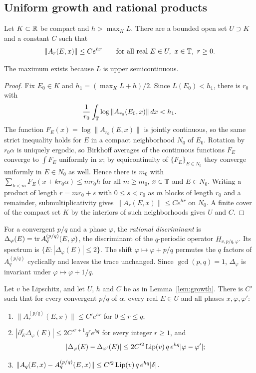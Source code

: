 \subsection{Uniform growth and rational products}

\begin{lemma}\label{lem:growth}
Let $K\subset\mathbb R$ be compact and $h>\max_KL$. There are a bounded open set $U\supset K$ and a constant $C$ such that
\[
\|A_r(E,x)\|\le Ce^{hr}\qquad\text{for all real }E\in U,\ x\in\mathbb T,\ r\ge0.
\]
\end{lemma}

The maximum exists because $L$ is upper semicontinuous.

\begin{proof}
Fix $E_0\in K$ and $h_1=(\max_KL+h)/2$. Since $L(E_0)<h_1$, there is $r_0$ with
\[
\frac1{r_0}\int_\mathbb T\log\|A_{r_0}(E_0,x)\|\,dx<h_1.
\]
The function $F_E(x)=\log\|A_{r_0}(E,x)\|$ is jointly continuous, so the same strict inequality holds for $E$ in a compact neighborhood $N_0$ of $E_0$. Rotation by $r_0\alpha$ is uniquely ergodic, so Birkhoff averages of the continuous functions $F_E$ converge to $\int F_E$ uniformly in $x$; by equicontinuity of $\{F_E\}_{E\in N_0}$ they converge uniformly in $E\in N_0$ as well. Hence there is $m_0$ with $\sum_{k<m}F_E(x+kr_0\alpha)\le mr_0h$ for all $m\ge m_0$, $x\in\mathbb T$ and $E\in N_0$. Writing a product of length $r=mr_0+s$ with $0\le s<r_0$ as $m$ blocks of length $r_0$ and a remainder, submultiplicativity gives $\|A_r(E,x)\|\le C e^{hr}$ on $N_0$. A finite cover of the compact set $K$ by the interiors of such neighborhoods gives $U$ and $C$.
\end{proof}

For a convergent $p/q$ and a phase $\varphi$, the \emph{rational discriminant} is $\Delta_\varphi(E)=\operatorname{tr} A^{(p/q)}_q(E,\varphi)$, the discriminant of the $q$-periodic operator $H_{v,p/q,\varphi}$. Its spectrum is $\{E:|\Delta_\varphi(E)|\le2\}$. The shift $\varphi\mapsto\varphi+p/q$ permutes the $q$ factors of $A^{(p/q)}_q$ cyclically and leaves the trace unchanged. Since $\gcd(p,q)=1$, $\Delta_\varphi$ is invariant under $\varphi\mapsto\varphi+1/q$.

\begin{lemma}\label{lem:ratprod}
Let $v$ be Lipschitz, and let $U$, $h$ and $C$ be as in Lemma~\ref{lem:growth}. There is $C'$ such that for every convergent $p/q$ of $\alpha$, every real $E\in U$ and all phases $x,\varphi,\varphi'$:
\begin{enumerate}
\item $\|A^{(p/q)}_r(E,x)\|\le C'e^{hr}$ for $0\le r\le q$;
\item $|\partial^r_E\Delta_\varphi(E)|\le 2C'^{r+1}q^re^{hq}$ for every integer $r\ge1$, and
\[
|\Delta_\varphi(E)-\Delta_{\varphi'}(E)|\le 2C'^2\operatorname{Lip}(v)\,q\,e^{hq}|\varphi-\varphi'|;
\]
\item $\|A_q(E,x)-A^{(p/q)}_q(E,x)\|\le C'^2\operatorname{Lip}(v)\,q\,e^{hq}|\delta|$.
\end{enumerate}
\end{lemma}

